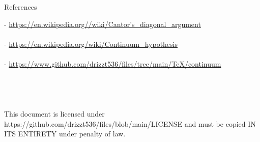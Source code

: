 \documentclass[12pt]{article}
\begin{document}
\pagebreak\begin{section}{References}\label{sec:references}

	\noindent- \url{https://en.wikipedia.org//wiki/Cantor's\_diagonal\_argument}\\
	\indent{}\\

	\noindent- \url{https://en.wikipedia.org/wiki/Continuum\_hypothesis}\\
	\indent{}\\

	\noindent- \url{https://www.github.com/drizzt536/files/tree/main/TeX/continuum}\\
	\indent{}
	\\
	\\
	\\
	\\
	This document is licensed under https://github.com/drizzt536/files/blob/main/LICENSE
	and must be copied IN ITS ENTIRETY under penalty of law.
\end{section}
\end{document}
